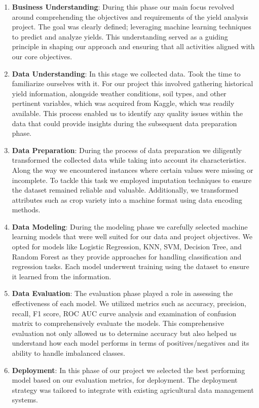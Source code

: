 \begin{enumerate}

    \item \textbf{Business Understanding}: During this phase our main focus revolved around comprehending the objectives and requirements of the yield analysis project. The goal was clearly defined; leveraging machine learning techniques to predict and analyze yields. This understanding served as a guiding principle in shaping our approach and ensuring that all activities aligned with our core objectives.
    
    \item \textbf{Data Understanding}: In this stage we collected data. Took the time to familiarize ourselves with it. For our project this involved gathering historical yield information, alongside weather conditions, soil types, and other pertinent variables, which was acquired from Kaggle, which was readily available. This process enabled us to identify any quality issues within the data that could provide insights during the subsequent data preparation phase.
    
    \item \textbf{Data Preparation}: During the process of data preparation we diligently transformed the collected data while taking into account its characteristics. Along the way we encountered instances where certain values were missing or incomplete. To tackle this task we employed imputation techniques to ensure the dataset remained reliable and valuable. Additionally, we transformed attributes such as crop variety into a machine format using data encoding methods.
    
    \item \textbf{Data Modeling}: During the modeling phase we carefully selected machine learning models that were well suited for our data and project objectives. We opted for models like Logistic Regression, KNN, SVM, Decision Tree, and Random Forest as they provide approaches for handling classification and regression tasks. Each model underwent training using the dataset to ensure it learned from the information.
    
    \item \textbf{Data Evaluation}: The evaluation phase played a role in assessing the effectiveness of each model. We utilized metrics such as accuracy, precision, recall, F1 score, ROC AUC curve analysis and examination of confusion matrix to comprehensively evaluate the models. This comprehensive evaluation not only allowed us to determine accuracy but also helped us understand how each model performs in terms of positives/negatives and its ability to handle imbalanced classes.
    
    \item \textbf{Deployment}: In this phase of our project we selected the best performing model based on our evaluation metrics, for deployment. The deployment strategy was tailored to integrate with existing agricultural data management systems.
\end{enumerate}
